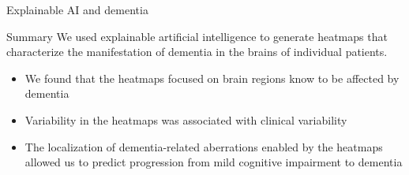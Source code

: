 \documentclass{beamer}
\begin{document}
\begin{frame}{Explainable AI and dementia}
    \end{frame}

    
    

    \begin{frame}{Summary}
        We used explainable artificial intelligence to generate heatmaps that characterize the manifestation of dementia in the brains of individual patients.
        \begin{itemize}
            \item We found that the heatmaps focused on brain regions know to be affected by dementia
            \item Variability in the heatmaps was associated with clinical variability
            \item The localization of dementia-related aberrations enabled by the heatmaps allowed us to predict progression from mild cognitive impairment to dementia
        \end{itemize}
    \end{frame}
\end{document}
